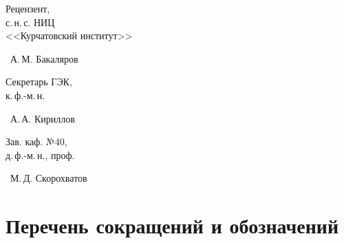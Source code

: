 \documentclass[a4paper,12pt]{extarticle}
\begin{document}
\begin{center}
\begin{minipage}[b][3\baselineskip][b]{0.4\textwidth}
Рецензент,\\
с.\,н.\,с. НИЦ\\
<<Курчатовский институт>>
\end{minipage}
\hspace{1cm}
\begin{minipage}[b][3\baselineskip][b]{0.5\textwidth}
\underline{\hspace{2cm}}~А.\,М. Бакаляров
\end{minipage}

\begin{minipage}[b][2\baselineskip][b]{0.4\textwidth}
Секретарь ГЭК,\\
к.\,ф.-м.\,н.
\end{minipage}
\hspace{1cm}
\begin{minipage}[b][2\baselineskip][b]{0.5\textwidth}
\underline{\hspace{2cm}}~А.\,А. Кириллов
\end{minipage}

\begin{minipage}[b][2\baselineskip][b]{0.4\textwidth}
Зав. каф. №40,\\
д.\,ф.-м.\,н., проф.
\end{minipage}
\hspace{1cm}
\begin{minipage}[b][2\baselineskip][b]{0.5\textwidth}
\underline{\hspace{2cm}}~М.\,Д. Скорохватов
\end{minipage}

\end{center}

\newpage
\setcounter{page}{3}
\tableofcontents

\newpage
{}
\section*{Перечень сокращений и обозначений}
\end{document}
